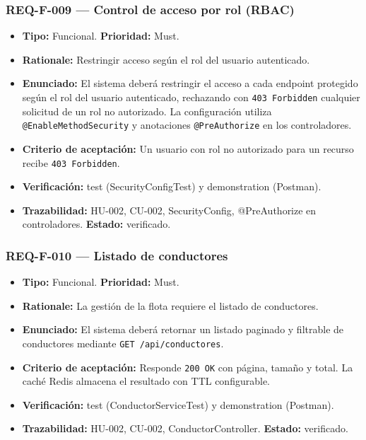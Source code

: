 \documentclass[12pt,a4paper]{article}
\begin{document}
\subsubsection{REQ-F-009 --- Control de acceso por rol (RBAC)}
\begin{itemize}
  \item \textbf{Tipo:} Funcional. \textbf{Prioridad:} Must.
  \item \textbf{Rationale:} Restringir acceso según el rol del usuario autenticado.
  \item \textbf{Enunciado:} El sistema deberá restringir el acceso a cada endpoint protegido según el rol del usuario autenticado, rechazando con \texttt{403 Forbidden} cualquier solicitud de un rol no autorizado. La configuración utiliza \texttt{@EnableMethodSecurity} y anotaciones \texttt{@PreAuthorize} en los controladores.
  \item \textbf{Criterio de aceptación:} Un usuario con rol no autorizado para un recurso recibe \texttt{403 Forbidden}.
  \item \textbf{Verificación:} test (SecurityConfigTest) y demonstration (Postman).
  \item \textbf{Trazabilidad:} HU-002, CU-002, SecurityConfig, @PreAuthorize en controladores. \textbf{Estado:} verificado.
\end{itemize}

\subsubsection{REQ-F-010 --- Listado de conductores}
\begin{itemize}
  \item \textbf{Tipo:} Funcional. \textbf{Prioridad:} Must.
  \item \textbf{Rationale:} La gestión de la flota requiere el listado de conductores.
  \item \textbf{Enunciado:} El sistema deberá retornar un listado paginado y filtrable de conductores mediante \texttt{GET /api/conductores}.
  \item \textbf{Criterio de aceptación:} Responde \texttt{200 OK} con página, tamaño y total. La caché Redis almacena el resultado con TTL configurable.
  \item \textbf{Verificación:} test (ConductorServiceTest) y demonstration (Postman).
  \item \textbf{Trazabilidad:} HU-002, CU-002, ConductorController. \textbf{Estado:} verificado.
\end{itemize}
\end{document}
